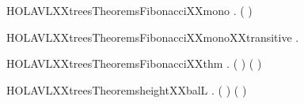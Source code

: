 \newcommand{\HOLAVLXXtreesTheoremsFibonacciXXind}{\UseVerbatim{HOLAVLXXtreesTheoremsFibonacciXXind}}
\begin{SaveVerbatim}{HOLAVLXXtreesTheoremsFibonacciXXmono}
\HOLTokenTurnstile{} \HOLSymConst{\HOLTokenForall{}}.   \HOLSymConst{\HOLTokenLeq{}}  ( \HOLSymConst{\ensuremath{+}} )
\end{SaveVerbatim}
\newcommand{\HOLAVLXXtreesTheoremsFibonacciXXmono}{\UseVerbatim{HOLAVLXXtreesTheoremsFibonacciXXmono}}
\begin{SaveVerbatim}{HOLAVLXXtreesTheoremsFibonacciXXmonoXXtransitive}
\HOLTokenTurnstile{} \HOLSymConst{\HOLTokenForall{}} .  \HOLSymConst{\HOLTokenLeq{}}  \HOLSymConst{\HOLTokenImp{}}   \HOLSymConst{\HOLTokenLeq{}}  
\end{SaveVerbatim}
\newcommand{\HOLAVLXXtreesTheoremsFibonacciXXmonoXXtransitive}{\UseVerbatim{HOLAVLXXtreesTheoremsFibonacciXXmonoXXtransitive}}
\begin{SaveVerbatim}{HOLAVLXXtreesTheoremsFibonacciXXthm}
\HOLTokenTurnstile{} \HOLSymConst{\HOLTokenForall{}}.  ( \HOLSymConst{\ensuremath{+}} ) \HOLSymConst{=}  ( \HOLSymConst{\ensuremath{+}} ) \HOLSymConst{\ensuremath{+}}  
\end{SaveVerbatim}
\newcommand{\HOLAVLXXtreesTheoremsFibonacciXXthm}{\UseVerbatim{HOLAVLXXtreesTheoremsFibonacciXXthm}}
\begin{SaveVerbatim}{HOLAVLXXtreesTheoremsheightXXbalL}
\HOLTokenTurnstile{} \HOLSymConst{\HOLTokenForall{}}   .
       \HOLSymConst{=}   \HOLSymConst{\ensuremath{+}}  \HOLSymConst{\HOLTokenConj{}}   \HOLSymConst{\HOLTokenConj{}}   \HOLSymConst{\HOLTokenImp{}}
      (    ) \HOLSymConst{=}   \HOLSymConst{\ensuremath{+}}  \HOLSymConst{\HOLTokenDisj{}}
      (    ) \HOLSymConst{=}   \HOLSymConst{\ensuremath{+}} 
\end{SaveVerbatim}
